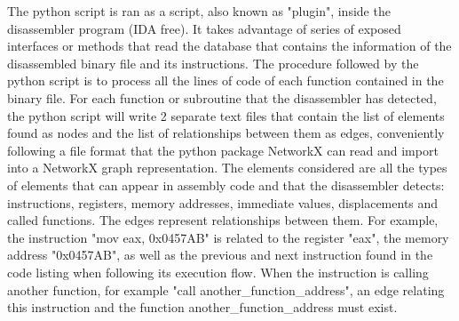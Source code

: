 \begin{appendices}
The python script is ran as a script, also known as "plugin", inside the disassembler program (IDA free). It takes advantage of series of exposed interfaces or methods that read the database that contains the information of the disassembled binary file and its instructions. The procedure followed by the python script is to process all the lines of code of each function contained in the binary file. For each function or subroutine that the disassembler has detected, the python script will write 2 separate text files that contain the list of elements found as nodes and the list of relationships between them as edges, conveniently following a file format that the python package NetworkX can read and import into a NetworkX graph representation. 
The elements considered are all the types of elements that can appear in assembly code and that the disassembler detects: instructions, registers, memory addresses, immediate values, displacements and called functions. The edges represent relationships between them. For example, the instruction "mov eax, 0x0457AB" is related to the register "eax", the memory address "0x0457AB", as well as the previous and next instruction found in the code listing when following its execution flow. When the instruction is calling another function, for example "call another\_function\_address", an edge relating this instruction and the function another\_function\_address must exist. 




\end{appendices}
